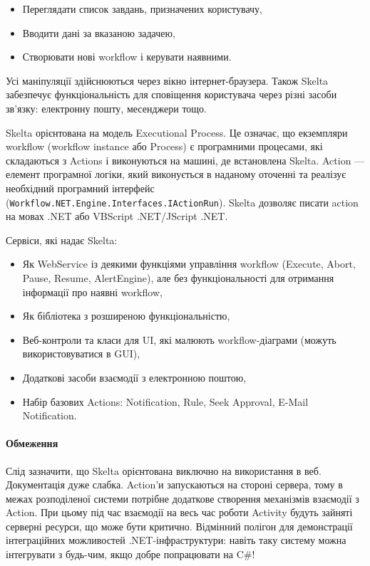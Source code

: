 \documentclass{memoir}
\begin{document}
\begin{itemize}
    \item Переглядати список завдань, призначених користувачу,
    \item Вводити дані за вказаною задачею,
    \item Створювати нові workflow і керувати наявними.
\end{itemize}

Усі маніпуляції здійснюються через вікно інтернет-браузера. Також Skelta забезпечує функціональність для сповіщення користувача через різні засоби зв’язку: електронну пошту, месенджери тощо.

Skelta орієнтована на модель Executional Process. Це означає, що екземпляри workflow (workflow instance або Process) є програмними процесами, які складаються з Actions і виконуються на машині, де встановлена Skelta. Action — елемент програмної логіки, який виконується в наданому оточенні та реалізує необхідний програмний інтерфейс (\texttt{Workflow.NET.Engine.Interfaces.IActionRun}). Skelta дозволяє писати action на мовах .NET або VBScript .NET/JScript .NET.

Сервіси, які надає Skelta:

\begin{itemize}
    \item Як WebService із деякими функціями управління workflow (Execute, Abort, Pause, Resume, AlertEngine), але без функціональності для отримання інформації про наявні workflow,
    \item Як бібліотека з розширеною функціональністю,
    \item Веб-контроли та класи для UI, які малюють workflow-діаграми (можуть використовуватися в GUI),
    \item Додаткові засоби взаємодії з електронною поштою,
    \item Набір базових Actions: Notification, Rule, Seek Approval, E-Mail Notification.
\end{itemize}

\paragraph{Обмеження}

Слід зазначити, що Skelta орієнтована виключно на використання в веб. Документація дуже слабка. Action’и запускаються на стороні сервера, тому в межах розподіленої системи потрібне додаткове створення механізмів взаємодії з Action. При цьому під час взаємодії на весь час роботи Activity будуть зайняті серверні ресурси, що може бути критично. Відмінний полігон для демонстрації інтеграційних можливостей .NET-інфраструктури: навіть таку систему можна інтегрувати з будь-чим, якщо добре попрацювати на C\#!
\end{document}
